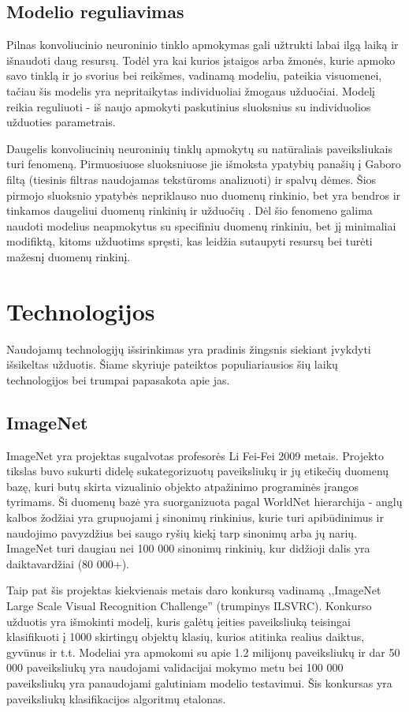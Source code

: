 \documentclass{VUMIFPSkursinis}
\begin{document}
\subsection{Modelio reguliavimas}
Pilnas konvoliucinio neuroninio tinklo apmokymas gali užtrukti labai ilgą laiką ir išnaudoti daug resursų. Todėl yra kai kurios įstaigos arba žmonės, kurie apmoko savo 
tinklą ir jo svorius bei reikšmes, vadinamą modeliu, pateikia visuomenei, tačiau šis modelis yra nepritaikytas individuoliai žmogaus užduočiai. Modelį reikia 
reguliuoti - iš naujo apmokyti paskutinius sluoksnius su individuolios užduoties parametrais.

Daugelis konvoliucinių neuroninių tinklų apmokytų su natūraliais paveiksliukais turi fenomeną. Pirmuosiuose sluoksniuose jie išmoksta ypatybių panašių į Gaboro filtą 
(tiesinis filtras naudojamas tekstūroms analizuoti) ir spalvų dėmes. Šios pirmojo sluoksnio ypatybės nepriklauso nuo duomenų rinkinio, bet yra bendros ir tinkamos 
daugeliui duomenų rinkinių ir užduočių \cite{DBLP:journals/corr/YosinskiCBL14}. Dėl šio fenomeno galima naudoti modelius neapmokytus su specifiniu duomenų rinkiniu, 
bet jį minimaliai modifiktą, kitoms užduotims spręsti, kas leidžia sutaupyti resursų bei turėti mažesnį duomenų rinkinį.

\section{Technologijos}
Naudojamų technologijų išsirinkimas yra pradinis žingsnis siekiant įvykdyti išsikeltas užduotis. Šiame skyriuje pateiktos populiariausios šių laikų technologijos 
bei trumpai papasakota apie jas.

\subsection{ImageNet}
ImageNet yra projektas sugalvotas profesorės Li Fei-Fei 2009 metais. Projekto tikslas buvo sukurti didelę sukategorizuotų paveiksliukų ir jų etikečių duomenų bazę, 
kuri butų skirta vizualinio objekto atpažinimo programinės įrangos tyrimams. Ši duomenų bazė yra suorganizuota pagal WorldNet hierarchija - anglų kalbos žodžiai 
yra grupuojami į sinonimų rinkinius, kurie turi apibūdinimus ir naudojimo pavyzdžius bei saugo ryšių kiekį tarp sinonimų arba jų narių. ImageNet turi daugiau nei 
100 000 sinonimų rinkinių, kur didžioji dalis yra daiktavardžiai (80 000+). 

Taip pat šis projektas kiekvienais metais daro konkursą vadinamą ,,ImageNet Large Scale Visual Recognition Challenge'' (trumpinys ILSVRC). Konkurso užduotis yra 
išmokinti modelį, kuris galėtų įeities paveiksliuką teisingai klasifikuoti į 1000 skirtingų objektų klasių, kurios atitinka realius daiktus, gyvūnus ir t.t. Modeliai 
yra apmokomi su apie 1.2 milijonų paveiksliukų ir dar 50 000 paveiksliukų yra naudojami validacijai mokymo metu bei 100 000 paveiksliukų yra panaudojami galutiniam 
modelio testavimui. Šis konkursas yra paveiksliukų klasifikacijos algoritmų etalonas.
\end{document}
